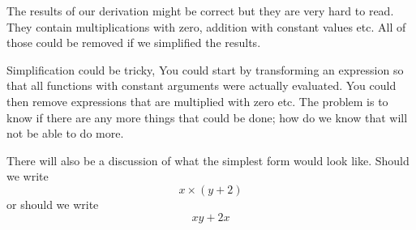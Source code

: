 \documentclass[a4paper,11pt]{article}
\begin{document}
The results of our derivation might be correct but they are very hard
to read. They contain multiplications with zero, addition with
constant values etc. All of those could be removed if we simplified the results.

Simplification could be tricky, You could start by transforming an
expression so that all functions with constant arguments were actually
evaluated. You could then remove expressions that are multiplied with
zero etc. The problem is to know if there are any more things that
could be done; how do we know that will not be able to do more.

There will also be a discussion of what the simplest form would look
like. Should we write $$ x \times (y + 2)$$ or should we write
$$xy + 2x$$
\end{document}
